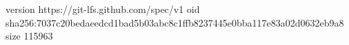 version https://git-lfs.github.com/spec/v1
oid sha256:7037c20bedaeedcd1bad5b03abc8c1ffb8237445e0bba117e83a02d0632eb9a8
size 115963
